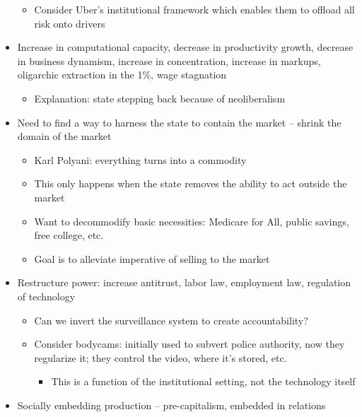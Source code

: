 \begin{itemize}
  \begin{itemize}
  \tightlist
  \item
    Consider Uber's institutional framework which enables them to
    offload all risk onto drivers
  \end{itemize}
\item
  Increase in computational capacity, decrease in productivity growth,
  decrease in business dynamism, increase in concentration, increase in
  markups, oligarchic extraction in the 1\%, wage stagnation

  \begin{itemize}
  \tightlist
  \item
    Explanation: state stepping back because of neoliberalism
  \end{itemize}
\item
  Need to find a way to harness the state to contain the market --
  shrink the domain of the market

  \begin{itemize}
  \tightlist
  \item
    Karl Polyani: everything turns into a commodity
  \item
    This only happens when the state removes the ability to act outside
    the market
  \item
    Want to decommodify basic necessities: Medicare for All, public
    savings, free college, etc.
  \item
    Goal is to alleviate imperative of selling to the market
  \end{itemize}
\item
  Restructure power: increase antitrust, labor law, employment law,
  regulation of technology

  \begin{itemize}
  \tightlist
  \item
    Can we invert the surveillance system to create accountability?
  \item
    Consider bodycams: initially used to subvert police authority, now
    they regularize it; they control the video, where it's stored, etc.

    \begin{itemize}
    \tightlist
    \item
      This is a function of the institutional setting, not the
      technology itself
    \end{itemize}
  \end{itemize}
\item
  Socially embedding production -- pre-capitalism, embedded in relations


\end{itemize}
